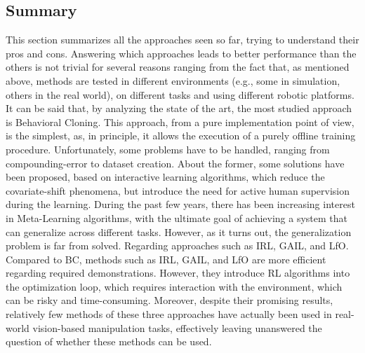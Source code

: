 \subsection{Summary}
\label{sec:summary}
This section summarizes all the approaches seen so far, trying to understand their pros and cons. Answering which approaches leads to better performance than the others is not trivial for several reasons ranging from the fact that, as mentioned above, methods are tested in different environments (e.g., some in simulation, others in the real world), on different tasks and using different robotic platforms. It can be said that, by analyzing the state of the art, the most studied approach is Behavioral Cloning. This approach, from a pure implementation point of view, is the simplest, as, in principle, it allows the execution of a purely offline training procedure. Unfortunately, some problems have to be handled, ranging from compounding-error to dataset creation. About the former, some solutions have been proposed, based on interactive learning algorithms, which reduce the covariate-shift phenomena, but introduce the need for active human supervision during the learning. During the past few years, there has been increasing interest in Meta-Learning algorithms, with the ultimate goal of achieving a system that can generalize across different tasks. However, as it turns out, the generalization problem is far from solved. 
Regarding approaches such as IRL, GAIL, and LfO. Compared to BC, methods such as IRL, GAIL, and LfO are more efficient regarding required demonstrations. However, they introduce RL algorithms into the optimization loop, which requires interaction with the environment, which can be risky and time-consuming. Moreover, despite their promising results, relatively few methods of these three approaches have actually been used in real-world vision-based manipulation tasks, effectively leaving unanswered the question of whether these methods can be used.